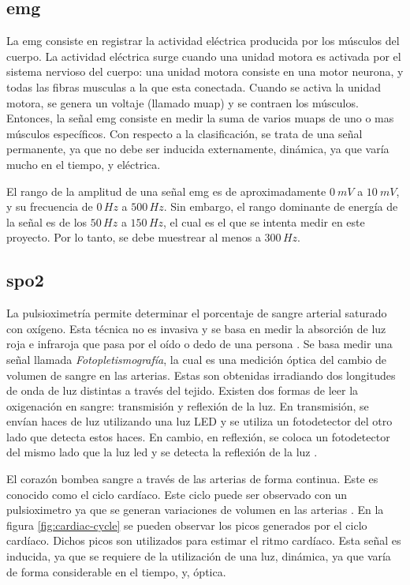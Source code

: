 \subsection{\gls{emg}}

La \gls{emg} consiste en registrar la actividad eléctrica producida por los músculos del cuerpo. La actividad eléctrica surge cuando una unidad motora es activada por el sistema nervioso del cuerpo: una unidad motora consiste en una motor neurona, y todas las fibras musculas a la que esta conectada.  Cuando se activa la unidad motora, se genera un voltaje (llamado \acrshort{muap}) y se contraen los músculos.  Entonces, la señal \acrshort{emg} consiste en medir la suma de varios \acrshort{muap}s de uno o mas músculos específicos. Con respecto a la clasificación, se trata de una señal permanente, ya que no debe ser inducida externamente, dinámica, ya que varía mucho en el tiempo, y eléctrica.

El rango de la amplitud de una señal \acrshort{emg} es de aproximadamente $0\ mV$ a $10\ mV$, y su frecuencia de $0\, Hz$ a $500\, Hz$.  Sin embargo, el rango dominante de energía de la señal es de los $50\, Hz$ a $150\, Hz$, el cual es el que se intenta medir en este proyecto. Por lo tanto, se debe muestrear al menos a $300 \, Hz$.

\subsection{\gls{spo2}}

La pulsioximetría permite determinar el porcentaje de sangre arterial saturado con oxígeno. Esta técnica no es invasiva y se basa en medir la absorción de luz roja e infraroja que pasa por el oído o dedo de una persona \cite{spo2-1}. Se basa medir una señal llamada \emph{Fotopletismografía}, la cual es una medición óptica del cambio de volumen de sangre en las arterias. Estas son obtenidas irradiando dos longitudes de onda de luz distintas a través del tejido. Existen dos formas de leer la oxigenación en sangre: transmisión y reflexión de la luz. En transmisión, se envían haces de luz utilizando una luz LED y se utiliza un fotodetector del otro lado que detecta estos haces. En cambio, en reflexión, se coloca un fotodetector del mismo lado que la luz led y se detecta la reflexión de la luz \cite{spo2-2}.  

El corazón bombea sangre a través de las arterias de forma continua. Este es conocido como el ciclo cardíaco. Este ciclo puede ser observado con un pulsioximetro ya que se generan variaciones de volumen en las arterias \cite{spo2-2}. En la figura \ref{fig:cardiac-cycle} se pueden observar los picos generados por el ciclo cardíaco. Dichos picos son utilizados para estimar el ritmo cardíaco. Esta señal es inducida, ya que se requiere de la utilización de una luz, dinámica, ya que varía de forma considerable en el tiempo, y, óptica.


